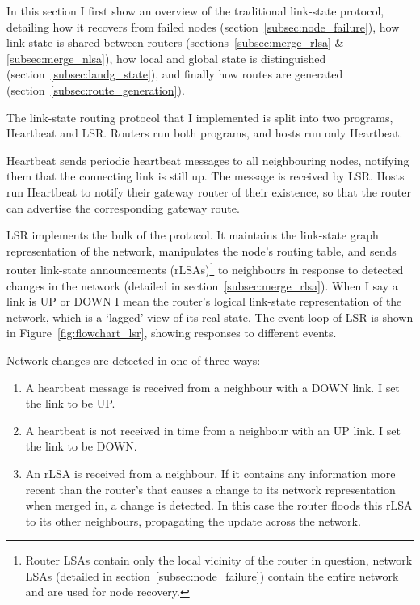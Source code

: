 \documentclass[withindex,glossary,openany]{cam-thesis}
\begin{document}
In this section I first show an overview of the traditional link-state protocol, detailing how it recovers from failed nodes (section~\ref{subsec:node_failure}), how link-state is shared between routers (sections~\ref{subsec:merge_rlsa} \& \ref{subsec:merge_nlsa}), how local and global state is distinguished (section~\ref{subsec:landg_state}), and finally how routes are generated (section~\ref{subsec:route_generation}).

The link-state routing protocol that I implemented is split into two programs, Heartbeat and LSR.  Routers run both programs, and hosts run only Heartbeat.

Heartbeat sends periodic heartbeat messages to all neighbouring nodes, notifying them that the connecting link is still up. The message is received by LSR. Hosts run Heartbeat to notify their gateway router of their existence, so that the router can advertise the corresponding gateway route.

LSR implements the bulk of the protocol. It maintains the link-state graph representation of the network, manipulates the node's routing table, and sends router link-state announcements (rLSAs)\footnote{Router LSAs contain only the local vicinity of the router in question, network LSAs (detailed in section~\ref{subsec:node_failure}) contain the entire network and are used for node recovery.} to neighbours in response to detected changes in the network (detailed in section~\ref{subsec:merge_rlsa}). When I say a link is UP or DOWN I mean the router's logical link-state representation of the network, which is a `lagged' view of its real state. The event loop of LSR is shown in Figure~\ref{fig:flowchart_lsr}, showing responses to different events.

Network changes are detected in one of three ways:
\begin{enumerate}
	\item
	A heartbeat message is received from a neighbour with a DOWN link. I set the link to be UP.
	
	\item
	A heartbeat is not received in time from a neighbour with an UP link. I set the link to be DOWN.
	
	\item
	An rLSA is received from a neighbour. If it contains any information more recent than the router's that causes a change to its network representation when merged in, a change is detected. In this case the router floods this rLSA to its other neighbours, propagating the update across the network.
\end{enumerate}
\end{document}
